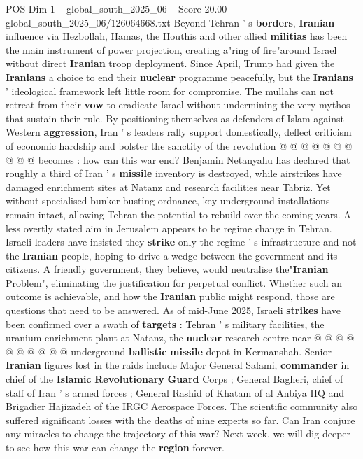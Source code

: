 \begin{textsample}{POS Dim 1 – global\_south\_2025\_06 – Score 20.00 – global\_south\_2025\_06/126064668.txt}
Beyond Tehran ' s \textbf{borders}, \textbf{Iranian} influence via Hezbollah, Hamas, the Houthis and other allied \textbf{militias} has been the main instrument of power projection, creating a"ring of fire"around Israel without direct \textbf{Iranian} troop deployment.
Since April, Trump had given the \textbf{Iranians} a choice to end their \textbf{nuclear} programme peacefully, but the \textbf{Iranians} ' ideological framework left little room for compromise.
The mullahs can not retreat from their \textbf{vow} to eradicate Israel without undermining the very mythos that sustain their rule.
By positioning themselves as defenders of Islam against Western \textbf{aggression}, Iran ' s leaders rally support domestically, deflect criticism of economic hardship and bolster the sanctity of the revolution @ @ @ @ @ @ @ @ @ @ becomes : how can this war end?
Benjamin Netanyahu has declared that roughly a third of Iran ' s \textbf{missile} inventory is destroyed, while airstrikes have damaged enrichment sites at Natanz and research facilities near Tabriz.
Yet without specialised bunker-busting ordnance, key underground installations remain intact, allowing Tehran the potential to rebuild over the coming years.
A less overtly stated aim in Jerusalem appears to be regime change in Tehran.
Israeli leaders have insisted they \textbf{strike} only the regime ' s infrastructure and not the \textbf{Iranian} people, hoping to drive a wedge between the government and its citizens.
A friendly government, they believe, would neutralise the"\textbf{Iranian} Problem", eliminating the justification for perpetual conflict.
Whether such an outcome is achievable, and how the \textbf{Iranian} public might respond, those are questions that need to be answered.
As of mid-June 2025, Israeli \textbf{strikes} have been confirmed over a swath of \textbf{targets} : Tehran ' s military facilities, the uranium enrichment plant at Natanz, the \textbf{nuclear} research centre near @ @ @ @ @ @ @ @ @ @ underground \textbf{ballistic} \textbf{missile} depot in Kermanshah.
Senior \textbf{Iranian} figures lost in the raids include Major General Salami, \textbf{commander} in chief of the \textbf{Islamic} \textbf{Revolutionary} \textbf{Guard} Corps ; General Bagheri, chief of staff of Iran ' s armed forces ; General Rashid of Khatam of al Anbiya HQ and Brigadier Hajizadeh of the IRGC Aerospace Forces.
The scientific community also suffered significant losses with the deaths of nine experts so far.
Can Iran conjure any miracles to change the trajectory of this war?
Next week, we will dig deeper to see how this war can change the \textbf{region} forever.

\end{textsample}
